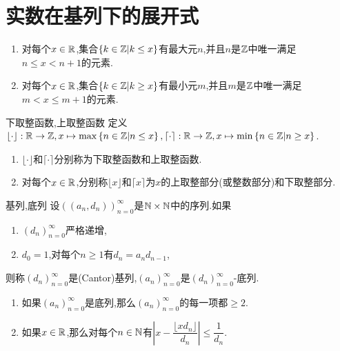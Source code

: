 \section{实数在基列下的展开式}

\begin{lemma}{}{}
	\begin{enumerate}
		\item 对每个$x\in\mathbb{R}$,集合$\left\{k\in\mathbb{Z}\middle|k\leq x\right\}$有最大元$n$,并且$n$是$\mathbb{Z}$中唯一满足$n\leq x<n+1$的元素.
		\item 对每个$x\in\mathbb{R}$,集合$\left\{k\in\mathbb{Z}\middle|k\geq x\right\}$有最小元$m$,并且$m$是$\mathbb{Z}$中唯一满足$m<x\leq m+1$的元素.
	\end{enumerate}
\end{lemma}

\begin{definition}{下取整函数,上取整函数}{}
	定义$\lfloor\cdot\rfloor:\mathbb{R}\to\mathbb{Z},x\mapsto\max\left\{n\in\mathbb{Z}\middle|n\leq x\right\},\lceil\cdot\rceil:\mathbb{R}\to\mathbb{Z},x\mapsto\min\left\{n\in\mathbb{Z}\middle|n\geq x\right\}$.
	\begin{enumerate}
		\item $\lfloor\cdot\rfloor$和$\lceil\cdot\rceil$分别称为下取整函数和上取整函数.
		\item 对每个$x\in\mathbb{R}$,分别称$\lfloor x\rfloor$和$\lceil x\rceil$为$x$的上取整部分(或整数部分)和下取整部分.
	\end{enumerate}
\end{definition}

\begin{definition}{基列,底列}{}
	设$\left(\left(a_{n},d_{n}\right)\right)_{n=0}^{\infty}$是$\mathbb{N}\times\mathbb{N}$中的序列.如果
	\begin{enumerate}
		\item $\left(d_{n}\right)_{n=0}^{\infty}$严格递增,
		\item $d_{0}=1$,对每个$n\geq 1$有$d_{n}=a_{n}d_{n-1}$,
	\end{enumerate}
	则称$\left(d_{n}\right)_{n=0}^{\infty}$是(Cantor)基列,$\left(a_{n}\right)_{n=0}^{\infty}$是$\left(d_{n}\right)_{n=0}^{\infty}$-底列.
\end{definition}

\begin{remark}{}{}
	\begin{enumerate}
		\item 如果$\left(a_{n}\right)_{n=0}^{\infty}$是底列,那么$\left(a_{n}\right)_{n=0}^{\infty}$的每一项都$\geq 2$.
		\item 如果$x\in\mathbb{R}$,那么对每个$n\in\mathbb{N}$有$\left|x-\dfrac{\lfloor xd_{n}\rfloor}{d_{n}}\right|\leq\dfrac{1}{d_{n}}$.
	\end{enumerate}
\end{remark}

